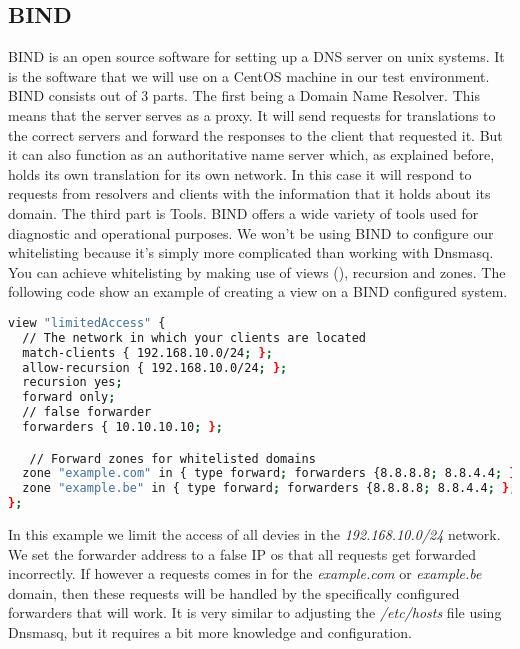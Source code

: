 \subsection{BIND}
BIND is an open source software for setting up a DNS server on unix systems. It is the software that we will use on a CentOS machine in our test environment. BIND consists out of 3 parts. The first being a Domain Name Resolver. This means that the server serves as a proxy. It will send requests for translations to the correct servers and forward the responses to the client that requested it. But it can also function as an authoritative name server which, as explained before, holds its own translation for its own network. In this case it will respond to requests from resolvers and clients with the information that it holds about its domain. The third part is Tools. BIND offers a wide variety of tools used for diagnostic and operational purposes. 
We won't be using BIND to configure our whitelisting because it's simply more complicated than working with Dnsmasq. You can achieve whitelisting by making use of views (\textcite{Views}), recursion and zones. The following code show an example of creating a view on a BIND configured system.
\begin{lstlisting}[language=sh]
view "limitedAccess" {
  // The network in which your clients are located
  match-clients { 192.168.10.0/24; };
  allow-recursion { 192.168.10.0/24; };
  recursion yes;
  forward only;
  // false forwarder
  forwarders { 10.10.10.10; };

   // Forward zones for whitelisted domains
  zone "example.com" in { type forward; forwarders {8.8.8.8; 8.8.4.4; }; };
  zone "example.be" in { type forward; forwarders {8.8.8.8; 8.8.4.4; }; };
};
\end{lstlisting}
In this example we limit the access of all devies in the \textit{192.168.10.0/24} network. We set the forwarder address to a false IP os that all requests get forwarded incorrectly. If however a requests comes in for the \textit{example.com} or \textit{example.be} domain, then these requests will be handled by the specifically configured forwarders that will work.
It is very similar to adjusting the \textit{/etc/hosts} file using Dnsmasq, but it requires a bit more knowledge and configuration.
